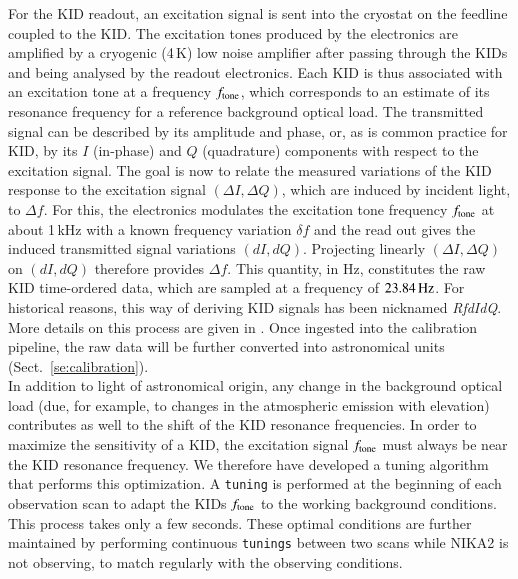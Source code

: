 For the KID readout, an excitation signal is sent into the cryostat on the
feedline coupled to the KID.
The excitation tones produced by the electronics are amplified by a
cryogenic (4\,K) low noise amplifier after passing through the KIDs and
being analysed by the readout electronics. {\lp Each KID is thus
associated with an excitation tone at a frequency $f_{\rm{tone}}$, which
corresponds to an estimate of its resonance frequency for a reference
background optical load.}
The transmitted signal can be described by its
amplitude and phase, or, as is common practice for KID, by its $I$
(in-phase) and $Q$ (quadrature) components
with respect to the excitation signal.
The goal is now to relate the measured variations of the KID response
to the excitation signal $(\Delta I, \Delta Q)$, which are induced by incident light, to
$\Delta f$. For this, the electronics modulates the excitation tone
frequency $f_{\rm{tone}}$ at about 1\,kHz with a known frequency variation $\delta f$
and the read out gives the induced transmitted signal variations
$(dI, dQ)$. Projecting linearly $(\Delta I, \Delta Q)$ on $(dI, dQ)$ therefore
provides $\Delta f$. This quantity, in Hz, constitutes the raw KID
time-ordered data, which are sampled at a frequency of
$23.84\,\rm{Hz}$. For historical reasons, this way of deriving KID
signals has been nicknamed \emph{RfdIdQ}. More details on this process
are given in \citet{Calvo2013}.
Once ingested into the calibration pipeline, the raw data will be further converted
into astronomical units (Sect.~\ref{se:calibration}).\\


In addition to light of astronomical origin, any change in the
background optical load (due, for example, to changes in
the atmospheric emission with elevation) contributes as well to
the shift of the KID resonance frequencies. In
order to maximize the sensitivity of a KID, the excitation signal $f_{\rm{tone}}$
must always be near the KID resonance frequency. We therefore have
developed a tuning algorithm that performs this optimization. A {\tt tuning} is performed at the beginning
of each observation scan to adapt the KIDs $f_{\rm{tone}}$ to the working background
conditions.
This process takes only a few seconds.
These optimal conditions are further maintained by performing
continuous {\tt tunings} between two scans while NIKA2 is not observing, to
match regularly with the observing conditions.

